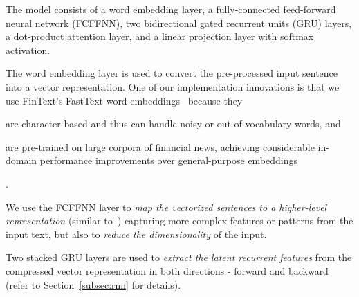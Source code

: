 \begin{minipage}[ht]{0.5\textwidth}
    The model consists of a word embedding layer, a fully-connected feed-forward neural network (FCFFNN), two bidirectional gated recurrent units (GRU) layers, a dot-product attention layer, and a linear projection layer with softmax activation.

    The word embedding layer is used to convert the pre-processed input sentence into a vector representation.
    One of our implementation innovations is that we use FinText's FastText word embeddings~\cite{rahimikia2021realised} because they
    \begin{enumerate*}
        \item are character-based and thus can handle noisy or out-of-vocabulary words, and
        \item are pre-trained on large corpora of financial news, achieving considerable in-domain performance improvements over general-purpose embeddings
    \end{enumerate*}.

    We use the FCFFNN layer to \emph{map the vectorized sentences to a higher-level representation} (similar to~\cite{saikh2020deep}) capturing more complex features or patterns from the input text, but also to \emph{reduce the dimensionality} of the input.

    Two stacked GRU layers are used to \emph{extract the latent recurrent features} from the compressed vector representation in both directions - forward and backward (refer to Section~\ref{subsec:rnn} for details).
\end{minipage}\hfill
